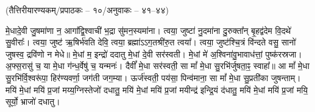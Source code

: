 
\vspace{-1ex}
\centerline{\normalsize (तैत्तिरीयारण्यकम्/प्रपाठकः – १०/अनुवाकः – ४१–४४)}

मे॒धादे॒वी जु॒षमा॑णा न॒ आगा᳚द्वि॒श्वाची॑ भ॒द्रा सु॑मन॒स्यमा॑ना। त्वया॒ जुष्टा॑ नु॒दमा॑ना दु॒रुक्ता᳚न् बृ॒हद्व॑देम वि॒दथे॑ सु॒वीराः᳚। त्वया॒ जुष्ट॑ ऋ॒षिर्भ॑वति देवि॒ त्वया॒ ब्रह्मा॑ऽऽग॒तश्री॑रु॒त त्वया᳚। त्वया॒ जुष्ट॑श्चि॒त्रं वि॑न्दते वसु॒ सानो॑ जुषस्व॒ द्रवि॑णो न मेधे॥ 
मे॒धां म॒ इन्द्रो॑ ददातु मे॒धां दे॒वी सर॑स्वती। मे॒धां मे॑ अ॒श्विना॑वु॒भावाध॑त्तां॒ पुष्क॑रस्रजा। अ॒फ्स॒रासु॑ च॒ या मे॒धा ग॑न्ध॒र्वेषु॑ च॒ यन्मनः॑। दैवीं᳚ मे॒धा सर॑स्वती॒ सा मां᳚ मे॒धा सु॒रभि॑र्जुषता॒ꣴ॒ स्वाहा᳚॥ 
आ मां᳚ मे॒धा सु॒रभि॑र्वि॒श्वरू॑पा॒ हिर॑ण्यवर्णा॒ जग॑ती जग॒म्या। ऊर्ज॑स्वती॒ पय॑सा॒ पिन्व॑माना॒ सा मां᳚ मे॒धा सु॒प्रती॑का जुषन्ताम्। मयि॑ मे॒धां मयि॑ प्र॒जां मय्य॒ग्निस्तेजो॑ दधातु॒ मयि॑ मे॒धां मयि॑ प्र॒जां मयीन्द्र॑ इन्द्रि॒यं द॑धातु॒ मयि॑ मे॒धां मयि॑ प्र॒जां मयि॒ सूर्यो॒ भ्राजो॑ दधातु। 



